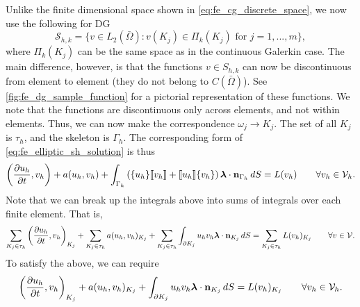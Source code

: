 \documentclass[oneside,a4paper,11pt]{report}
\begin{document}
Unlike the finite dimensional space shown in \cref{eq:fe_cg_discrete_space}, we now use the following for DG 
\begin{equation}
    \label{eq:dg_discretized_fe_space}
    \mathcal{S}_{h,k} = \{v \in L_2 \left ( \bar{\Omega} \right ): v(K_j) \in \Pi_{k}(K_j) \text{ for } j=1,...,m \},
\end{equation}
where $\Pi_{k}(K_j)$ can be the same space as in the continuous Galerkin case. The main difference, however, is that the functions $v \in S_{h,k}$ can now be discontinuous from element to element (they do not belong to $C(\bar{\Omega})$). See \cref{fig:fe_dg_sample_function} for a pictorial representation of these functions. We note that the functions are discontinuous only across elements, and not within elements. Thus, we can now make the correspondence $\omega_j \to K_j$. The set of all $K_j$ is $\tau_h$, and the skeleton is $\Gamma_h$. The corresponding form of \cref{eq:fe_elliptic_sh_solution} is thus
\begin{equation}
    \label{eq:dg_main_eq_total}
    \left ( \frac{\partial u_h}{\partial t} , v_h \right ) + a(u_h,v_h)  + \int_{\Gamma_h} \left ( \{ u_h \} \llbracket v_h \rrbracket + \llbracket u_h \rrbracket \{ v_h \} \right )\bm \lambda \cdot \mathbf{n}_{\Gamma_h} \, dS = L(v_h) \qquad \forall v_h \in \mathcal{V}_h .
\end{equation}
Note that we can break up the integrals above into sums of integrals over each finite element. That is,
\begin{equation}
    \sum_{K_j \in \tau_h} \left ( \frac{\partial u_h}{\partial t} , v_h \right )_{K_j} + \sum_{K_j \in \tau_h} a(u_h,v_h)_{K_j}  + \sum_{K_j \in \tau_h} \int_{\partial K_j} u_h v_h \bm \lambda \cdot \mathbf{n}_{K_j} \, dS = \sum_{K_j \in \tau_h} L(v_h)_{K_j} \qquad \forall v \in \mathcal{V} .
\end{equation}
To satisfy the above, we can require
\begin{equation}
    \label{eq:dg_main_eq_element_wise}
    \left ( \frac{\partial u_h}{\partial t} , v_h \right )_{K_j} + a(u_h,v_h)_{K_j}  + \int_{\partial K_j} u_h v_h \bm \lambda \cdot \mathbf{n}_{K_j} \, dS = L(v_h)_{K_j} \qquad \forall v_h \in \mathcal{V}_h .
\end{equation}
\end{document}
